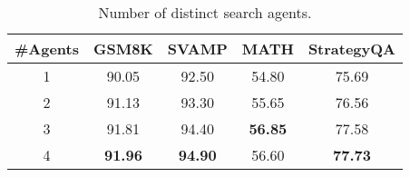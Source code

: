 \begin{table}[t]
\caption{
Number of distinct search agents.
}
\label{tab:num_of_agents}
\vskip 0.15in
\begin{center}
\begin{small}
\begin{tabular}{ccccc}
\toprule
\#Agents & GSM8K & SVAMP & MATH & StrategyQA \\
\midrule
1 & 90.05  & 92.50 & 54.80 & 75.69 \\
2 & 91.13  & 93.30 & 55.65 & 76.56 \\
3 & 91.81  & 94.40 & \textbf{56.85} & 77.58  \\
4 &  \textbf{91.96} &  \textbf{94.90} &  56.60 &  \textbf{77.73} \\
\bottomrule
\end{tabular}
\end{small}
\end{center}
\vskip -0.1in
\end{table}